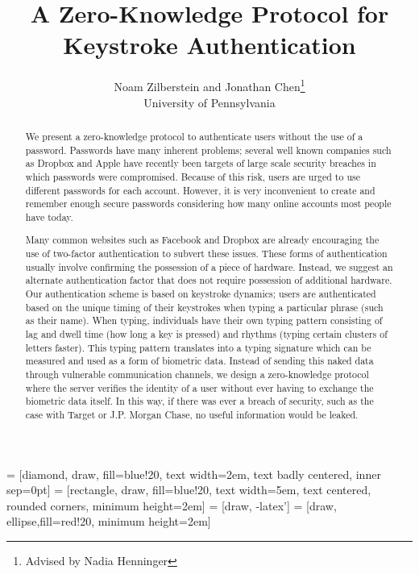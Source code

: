 \documentclass[11pt]{article}
\begin{document}
 = [diamond, draw, fill=blue!20, 
    text width=2em, text badly centered, inner sep=0pt]
 = [rectangle, draw, fill=blue!20, 
    text width=5em, text centered, rounded corners, minimum height=2em]
 = [draw, -latex']
 = [draw, ellipse,fill=red!20,
    minimum height=2em]

\title{A Zero-Knowledge Protocol for Keystroke Authentication}

\author{Noam Zilberstein and Jonathan Chen\thanks{Advised by Nadia Henninger} \\
University of Pennsylvania
}

\maketitle

\begin{abstract}
  We present a zero-knowledge protocol to authenticate users without the use of a password. Passwords have many inherent problems; several well known companies such as Dropbox and Apple have recently been targets of large scale security breaches in which passwords were compromised. Because of this risk, users are urged to use different passwords for each account. However, it is very inconvenient to create and remember enough secure passwords considering how many online accounts most people have today.

Many common websites such as Facebook and Dropbox are already encouraging the use of two-factor authentication to subvert these issues. These forms of authentication usually involve confirming the possession of a piece of hardware. Instead, we suggest an alternate authentication factor that does not require possession of additional hardware. Our authentication scheme is based on keystroke dynamics; users are authenticated based on the unique timing of their keystrokes when typing a particular phrase (such as their name). When typing, individuals have their own typing pattern consisting of lag and dwell time (how long a key is pressed) and rhythms (typing certain clusters of letters faster).  This typing pattern translates into a typing signature which can be measured and used as a form of biometric data. Instead of sending this naked data through vulnerable communication channels, we design a zero-knowledge protocol where the server verifies the identity of a user without ever having to exchange the biometric data itself. In this way, if there was ever a breach of security, such as the case with Target or J.P. Morgan Chase, no useful information would be leaked.
\end{abstract}
\end{document}

